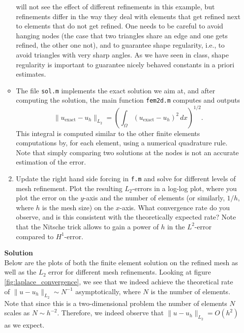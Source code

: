 \documentclass[11pt]{article}
\begin{document}
\begin{enumerate}
\begin{itemize}
{      will not see the effect of different refinements in this
      example, but refinements differ in the way they deal with
      elements that get refined next to elements that do not get
      refined. One needs to be careful to avoid hanging nodes (the
      case that two triangles share an edge and one gets refined, the
      other one not), and to guarantee shape regularity, i.e., to
      avoid triangles with very sharp angles. As we have seen in
      class, shape regularity is important to guarantee nicely behaved
      constants in a priori estimates.}
  \item The file \texttt{sol.m} implements the exact solution we aim
    at, and after computing the solution, the main function
    \texttt{fem2d.m} computes and outputs
    \begin{equation}
      \|u_{\text{exact}}-u_h\|_{L_2} = \left(\int_\Omega
      (u_{\text{exact}}-u_h)^2\,dx\right)^{1/2}.
    \end{equation}
    This integral is computed similar to the other finite elements
    computations by, for each element, using a numerical quadrature
    rule. Note that simply comparing two solutions at the nodes is not
    an accurate estimation of the error.
  \end{itemize}
  \begin{enumerate}
  \setcounter{enumii}{1}
  \item Update the right hand side forcing in \texttt{f.m} and solve
    for different levels of mesh refinement. Plot the resulting
     $L_2$-errors in a log-log plot, where you plot the error on the
     $y$-axis and the number of elements (or similarly, $1/h$, where
     $h$ is the mesh size) on the $x$-axis. What convergence rate do
     you observe, and is this consistent with the theoretically
     expected rate? Note that the Nitsche trick allows to gain a
     power of $h$ in the $L^2$-error compared to $H^1$-error.
  \end{enumerate}


{\bf Solution}\\
Below are the plots of both the finite element solution on the refined mesh as well as the $L_2$ error for different mesh refinements.  Looking at figure \ref{fig:laplace_convergence}, we see that we indeed achieve the theoretical rate of $\|u - u_h\|_{L_2} \sim N^{-1}$ asymptotically, where $N$ is the number of elements.  Note that since this is a two-dimensional problem the number of elements $N$ scales as $N \sim h^{-2}$.  Therefore, we indeed observe that $\|u-u_h\|_{L_2} = O(h^2)$ as we expect.


\end{enumerate}
\end{document}
